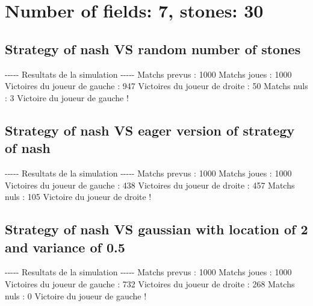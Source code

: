 \documentclass{article}%
\begin{document}
%
\section{Number of fields: 7, stones: 30}%
\label{sec:Number of fields 7, stones 30}%
\subsection{Strategy of nash VS random number of stones}%
\label{subsec:Strategy of nash VS random number of stones}%
{-}{-}{-}{-}{-} Resultats de la simulation {-}{-}{-}{-}{-}\newline%
		\newline%
Matchs prevus : 1000\newline%
Matchs joues : 1000\newline%
\newline%
Victoires du joueur de gauche : 947\newline%
Victoires du joueur de droite : 50\newline%
Matchs nuls : 3\newline%
\newline%
Victoire du joueur de gauche !

%
\subsection{Strategy of nash VS eager version of strategy of nash}%
\label{subsec:Strategy of nash VS eager version of strategy of nash}%
{-}{-}{-}{-}{-} Resultats de la simulation {-}{-}{-}{-}{-}\newline%
		\newline%
Matchs prevus : 1000\newline%
Matchs joues : 1000\newline%
\newline%
Victoires du joueur de gauche : 438\newline%
Victoires du joueur de droite : 457\newline%
Matchs nuls : 105\newline%
\newline%
Victoire du joueur de droite !

%
\subsection{Strategy of nash VS gaussian with location of 2 and variance of 0.5}%
\label{subsec:Strategy of nash VS gaussian with location of 2 and variance of 0.5}%
{-}{-}{-}{-}{-} Resultats de la simulation {-}{-}{-}{-}{-}\newline%
		\newline%
Matchs prevus : 1000\newline%
Matchs joues : 1000\newline%
\newline%
Victoires du joueur de gauche : 732\newline%
Victoires du joueur de droite : 268\newline%
Matchs nuls : 0\newline%
\newline%
Victoire du joueur de gauche !
\end{document}

